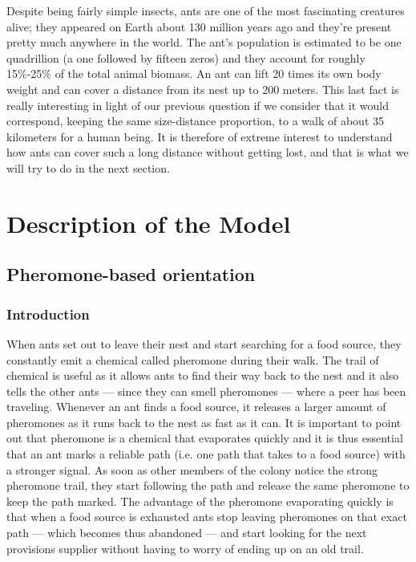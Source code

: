\documentclass[11pt]{article}
\begin{document}
Despite being fairly simple insects, ants are one of the most fascinating creatures alive; they appeared on Earth about 130 million years ago and they're present pretty much anywhere in the world. The ant's population is estimated to be one quadrillion (a one followed by fifteen zeros) and they account for roughly 15\%-25\% of the total animal biomass. An ant can lift 20 times its own body weight and can cover a distance from its nest up to 200 meters. This last fact is really interesting in light of our previous question if we consider that it would correspond, keeping the same size-distance proportion, to a walk of about 35 kilometers for a human being. It is therefore of extreme interest to understand how ants can cover such a long distance without getting lost, and that is what we will try to do in the next section.

\section{Description of the Model}

\subsection{Pheromone-based orientation}
\subsubsection{Introduction}
When ants set out to leave their nest and start searching for a food source, they constantly emit a chemical called pheromone during their walk. The trail of chemical is useful as it allows ants to find their way back to the nest and it also tells the other ants --- since they can smell pheromones --- where a peer has been traveling. Whenever an ant finds a food source, it releases a larger amount of pheromones as it runs back to the nest as fast as it can. It is important to point out that pheromone is a chemical that evaporates quickly and it is thus essential that an ant marks a reliable path (i.e. one path that takes to a food source) with a stronger signal. As soon as other members of the colony notice the strong pheromone trail, they start following the path and release the same pheromone to keep the path marked. The advantage of the pheromone evaporating quickly is that when a food source is exhausted ants stop leaving pheromones on that exact path --- which becomes thus abandoned --- and start looking for the next provisions supplier without having to worry of ending up on an old trail.
\end{document}
